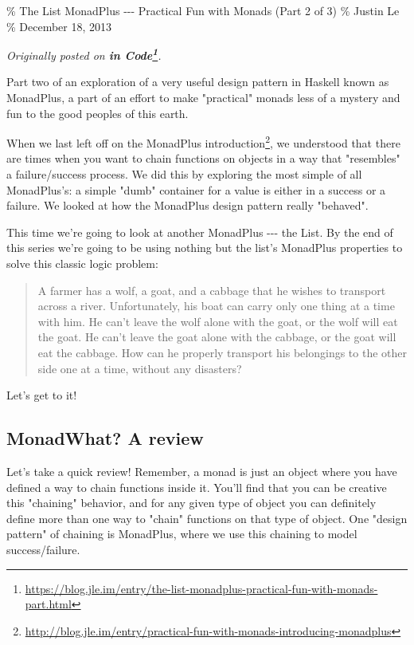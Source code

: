 \documentclass[]{article}
\renewcommand{\href}[2]{#2\footnote{\url{#1}}}
\begin{document}
\% The List MonadPlus -\/-\/- Practical Fun with Monads (Part 2 of 3) \% Justin
Le \% December 18, 2013

\emph{Originally posted on
\textbf{\href{https://blog.jle.im/entry/the-list-monadplus-practical-fun-with-monads-part.html}{in
Code}}.}

Part two of an exploration of a very useful design pattern in Haskell known as
MonadPlus, a part of an effort to make "practical" monads less of a mystery and
fun to the good peoples of this earth.

When we last left off on the
\href{http://blog.jle.im/entry/practical-fun-with-monads-introducing-monadplus}{MonadPlus
introduction}, we understood that there are times when you want to chain
functions on objects in a way that "resembles" a failure/success process. We did
this by exploring the most simple of all MonadPlus's: a simple "dumb" container
for a value is either in a success or a failure. We looked at how the MonadPlus
design pattern really "behaved".

This time we're going to look at another MonadPlus -\/-\/- the List. By the end
of this series we're going to be using nothing but the list's MonadPlus
properties to solve this classic logic problem:

\begin{quote}
A farmer has a wolf, a goat, and a cabbage that he wishes to transport across a
river. Unfortunately, his boat can carry only one thing at a time with him. He
can't leave the wolf alone with the goat, or the wolf will eat the goat. He
can't leave the goat alone with the cabbage, or the goat will eat the cabbage.
How can he properly transport his belongings to the other side one at a time,
without any disasters?
\end{quote}

Let's get to it!

\subsection{MonadWhat? A review}

Let's take a quick review! Remember, a monad is just an object where you have
defined a way to chain functions inside it. You'll find that you can be creative
this "chaining" behavior, and for any given type of object you can definitely
define more than one way to "chain" functions on that type of object. One
"design pattern" of chaining is MonadPlus, where we use this chaining to model
success/failure.
\end{document}
